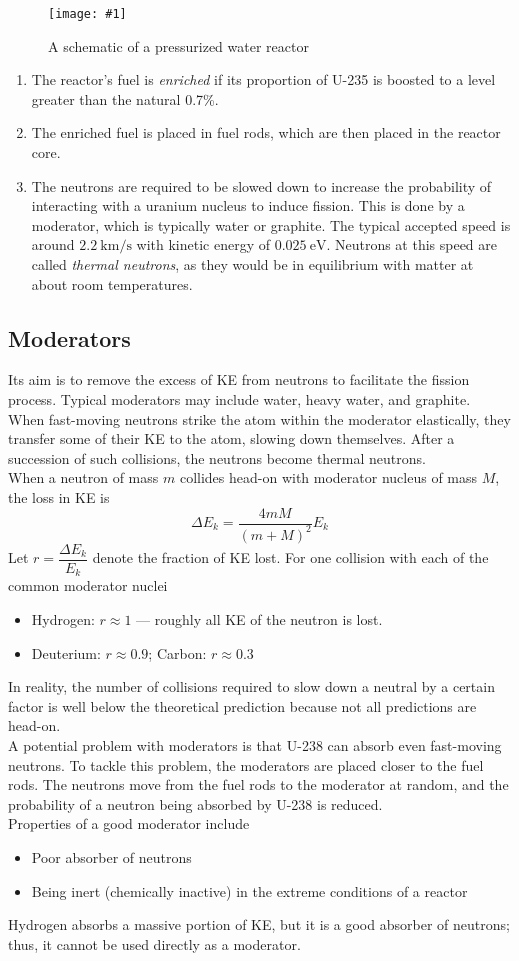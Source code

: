\documentclass[a4paper,12pt]{article}
\newcommand{\lb}{\\[8pt]}
\newcommand{\img}[4]{\begin{center}
  \begin{figure}[H]
    \centering
    \texttt{[image: \#1]}
    \caption{#3}
    \label{fig:#4}
  \end{figure}
\end{center}}
\begin{document}
\img{reactor.png}{1}{A schematic of a pressurized water reactor}{reactor}

\begin{enumerate}
  \item The reactor's fuel is \textit{enriched} if its proportion of U-235 is boosted to a level greater than the natural 0.7\%.

  \item The enriched fuel is placed in fuel rods, which are then placed in the reactor core.

  \item The neutrons are required to be slowed down to increase the probability of interacting with a uranium nucleus to induce fission. This is done by a moderator, which is typically water or graphite. The typical accepted speed is around $\SI{2.2}{\km\per\s}$ with kinetic energy of $\SI{0.025}{\eV}$. Neutrons at this speed are called \textit{thermal neutrons}, as they would be in equilibrium with matter at about room temperatures.
\end{enumerate}

\subsection{Moderators}

Its aim is to remove the excess of KE from neutrons to facilitate the fission process. Typical moderators may include water, heavy water, and graphite.\lb
When fast-moving neutrons strike the atom within the moderator elastically, they transfer some of their KE to the atom, slowing down themselves. After a succession of such collisions, the neutrons become thermal neutrons.\lb
When a neutron of mass $m$ collides head-on with moderator nucleus of mass $M$, the loss in KE is
$$\Delta E_k = \frac{4mM}{(m+M)^2}E_k$$
Let $r = \dfrac{\Delta E_k}{E_k}$ denote the fraction of KE lost. For one collision with each of the common moderator nuclei
\begin{itemize}
  \item Hydrogen: $r \approx 1$ --- roughly all KE of the neutron is lost.
  \item Deuterium: $r \approx 0.9$; Carbon: $r \approx 0.3$
\end{itemize}
In reality, the number of collisions required to slow down a neutral by a certain factor is well below the theoretical prediction because not all predictions are head-on.\lb
A potential problem with moderators is that U-238 can absorb even fast-moving neutrons. To tackle this problem, the moderators are placed closer to the fuel rods. The neutrons move from the fuel rods to the moderator at random, and the probability of a neutron being absorbed by U-238 is reduced.\lb
Properties of a good moderator include
\begin{itemize}
  \item Poor absorber of neutrons
  \item Being inert (chemically inactive) in the extreme conditions of a reactor
\end{itemize}
Hydrogen absorbs a massive portion of KE, but it is a good absorber of neutrons; thus, it cannot be used directly as a moderator.
\end{document}
